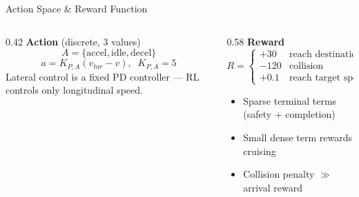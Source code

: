 \documentclass[aspectratio=169,10pt]{beamer}
\begin{document}
\begin{frame}{Action Space \& Reward Function}
	\begin{columns}[T]
		\begin{column}{0.42\textwidth}
			\textbf{Action} (discrete, 3 values)
			\[
				A = \{\text{accel}, \text{idle}, \text{decel}\}
			\]
			\[
				a = K_{P,A}(v_{tar} - v), \;\; K_{P,A}=5
			\]
			\small Lateral control is a fixed PD controller --- RL controls only longitudinal speed.
		\end{column}
		\begin{column}{0.58\textwidth}
			\textbf{Reward}
			\[
				R = \begin{cases}
					+30  & \text{reach destination}  \\
					-120 & \text{collision}          \\
					+0.1 & \text{reach target speed}
				\end{cases}
			\]
			\begin{itemize}
				\item Sparse terminal terms (safety + completion)
				\item Small dense term rewards cruising
				\item Collision penalty $\gg$ arrival reward
			\end{itemize}
		\end{column}
	\end{columns}
\end{frame}
\end{document}
